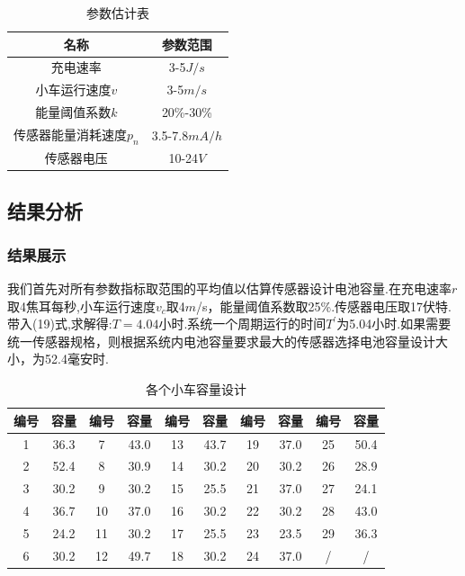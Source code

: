\documentclass{whutmod}
\begin{document}
\begin{table}[!htbp]
	\caption{参数估计表}\label{canshu2} \centering
	\begin{tabular}{cc}
		\toprule[1pt]
		名称 & 参数范围\\
		\midrule[1pt]
		充电速率& 3-5$J/s$\\
		小车运行速度$v$& 3-5$m/s$\\
		能量阈值系数$k$& 20\%-30\% \\
		传感器能量消耗速度$p_{n}$ &3.5-7.8$mA/h$ \\
		传感器电压&10-24$V$\\		
		\bottomrule[1.5pt]
	\end{tabular}
\end{table}

\subsection{结果分析}
\subsubsection{结果展示}
我们首先对所有参数指标取范围的平均值以估算传感器设计电池容量.在充电速率$r$取4焦耳每秒,小车运行速度$v_{c}$取4$m$/s，能量阈值系数取25\%.传感器电压取17伏特.带入(19)式,求解得:$T=4.04$小时.系统一个周期运行的时间$T^{\prime}$为5.04小时.如果需要统一传感器规格，则根据系统内电池容量要求最大的传感器选择电池容量设计大小，为52.4毫安时.



\begin{table}[!htbp]
	\caption{各个小车容量设计}\label{canshu3} \centering
	\begin{tabular}{cccccccccc}
		\toprule[1pt]
		编号 & 容量 & 编号 & 容量 & 编号 & 容量 & 编号 & 容量 & 编号 & 容量\\
		\midrule[1pt]
		1 & 36.3  & 7 & 43.0 & 13 & 43.7 & 19 &  37.0 & 25 & 50.4\\
		2 & 52.4 & 8 &  30.9 & 14 & 30.2 & 20 & 30.2 & 26 & 28.9\\
		3 & 30.2 & 9 &  30.2 & 15 & 25.5 & 21 &  37.0 &27 & 24.1\\
		4 & 36.7 & 10 &  37.0 & 16 & 30.2 & 22 & 30.2 & 28 & 43.0\\
		5 & 24.2 & 11 &   30.2 & 17 & 25.5 & 23 & 23.5 & 29 & 36.3\\
		6 & 30.2 & 12 &   49.7 & 18 & 30.2 & 24 & 37.0  & /  & / \\
		\bottomrule[1.5pt]
	\end{tabular}
	\centering
\end{table}
\end{document}
